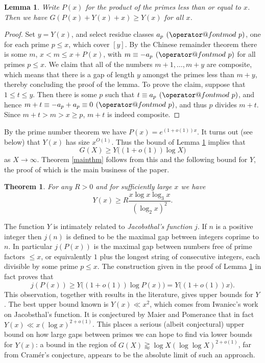 \documentclass[12pt]{amsart}
\makeatletter
\numberwithin{equation}{section}  %
\theoremstyle{remark}
\theoremstyle{plain}
\newtheorem{lem}{Lemma}[section]
\newtheorem{thm}{Theorem}
\numberwithin{equation}{section}
\renewcommand{\pmod}[1]{\allowbreak\mkern7mu({\operator@font mod}\,\,#1)}
\renewcommand{\leq}{\leqslant}
\renewcommand{\geq}{\geqslant}
\renewcommand{\(}{\left(}
\renewcommand{\)}{\right)}
\makeatother
\begin{document}
\begin{lem}\label{lem11}
Write $P(x)$ for the product of the primes less than or equal to $x$. Then we have $G(P(x)+ Y(x) + x) \geq Y(x)$ for all $x$.
\end{lem}
\begin{proof}
Set $y = Y(x)$, and select residue classes $a_p \pmod{p}$, one for each prime $p \leq x$, which cover $[y]$. By the Chinese remainder theorem there is some $m$, $x <  m \leq x +P(x)$, with $m \equiv -a_p \pmod{p}$ for all primes $p \leq x$. We claim that all of the numbers $m+1,\dots, m+y$ are composite, which means that there is a gap of length $y$ amongst the primes less than $m+y$, thereby concluding the proof of the lemma. To prove the claim, suppose that $1 \leq t \leq y$. Then there is some $p$ such that $t \equiv a_p \pmod{p}$, and hence $m + t \equiv -a_p + a_p \equiv 0 \pmod{p}$, and thus $p$ divides $m + t$. Since $m+t > m > x \geq p$, $m + t$ is indeed composite.
\end{proof}

By the prime number theorem we have $P(x) = e^{(1 + o(1))x}$. It turns out (see below) that $Y(x)$ has size $x^{O(1)}$. Thus the bound of Lemma \ref{lem11} implies that
\[ G(X) \geq Y\big((1 + o(1)) \log X\big)\]
as $X \to \infty$.  Theorem \ref{mainthm} follows from this and the following bound for $Y$, the proof of which is the main business of the paper.
\begin{thm}\label{mainthm-y}
For any $R > 0$ and for sufficiently large $x$ we have
\begin{equation}\label{yxdef}
 Y(x) \geq R \frac{x \log x \log_3 x}{(\log_2 x)^2}.
\end{equation}
\end{thm}


The function $Y$ is intimately related to \emph{Jacobsthal's function} $j$. If $n$ is a positive integer then $j(n)$ is defined to be the maximal gap between integers coprime to $n$. In particular $j(P(x))$ is the maximal gap between numbers free of prime factors $\leq x$, or equivalently $1$ plus the longest string of consecutive integers, each divisible by some prime $p \leq x$.  The construction given in the proof of Lemma \ref{lem11} in fact proves that 
\[ j(P(x)) \geq Y\big((1 + o(1)) \log P(x)\big) = Y\big((1 + o(1)) x\big).\]
This observation, together with results in the literature, gives upper bounds for $Y$. The best upper bound known is $Y(x) \ll x^2$, which comes from Iwaniec's work \cite{Iw} on Jacobsthal's function. It is conjectured by Maier and Pomerance that in fact $Y(x) \ll x (\log x)^{2 + o(1)}$. This places a serious (albeit conjectural) upper bound on how large gaps between primes we can hope to find via lower bounds for $Y(x)$: a bound in the region of $G(X) \gtrapprox \log X (\log \log X)^{2 + o(1)}$, far from Cram\'er's conjecture, appears to be the absolute limit of such an approach.
\end{document}
